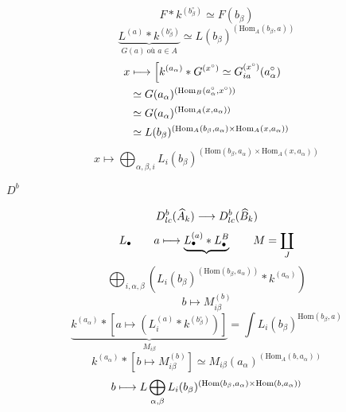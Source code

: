 \[
F*k^{(b_\beta^\circ)}\simeq F(b_\beta)
\]
\[
\underbrace{L^{(a)}*k^{(b_\beta^\circ)}}_{G(a)\ \text{où }a\in A}
\simeq L(b_\beta)^{(\mathrm{Hom}_A(b_\beta,a))}
\]
\[
\begin{aligned}
x&\longmapsto\left[k^{(a_\alpha)}*G^{(x^\circ)}
 \simeq G_{{i}{{a}}}^{(x^\circ)}(a_\alpha^\circ)\right.\\
&\simeq G(a_\alpha)^{(\mathrm{Hom}_{{B}}(a_\alpha^\circ,x^\circ))}\\
&\simeq G(a_\alpha)^{(\mathrm{Hom}_A(x,a_\alpha))}\\
&\simeq L(b_\beta)^{(\mathrm{Hom}_A(b_\beta,a_\alpha)\times\mathrm{Hom}_A(x,a_\alpha))}
\end{aligned}
\]
\[
x\longmapsto\bigoplus_{\alpha,\beta,i}L_i(b_\beta)^{(\mathrm{Hom}(b_\beta,a_\alpha)\times\mathrm{Hom}_A(x,a_\alpha))}
\]

$D^b$


\[
D_{lc}^b(\widehat A_k)\longrightarrow D_{lc}^b(\widehat{{B}}_k)
\]
\[
L_\bullet\qquad a\longmapsto\underbrace{L_\bullet^{(a)}*L_\bullet^B}
\qquad M=\coprod_{{J}}
\]
\[
\bigoplus_{i,\alpha,\beta}
\left(L_i(b_\beta)^{(\mathrm{Hom}(b_\beta,a_\alpha))}*k^{(a_\alpha)}\right)
\]
\[
b\longmapsto M_{i\beta}^{(b)}
\]
\[
\underbrace{k^{(a_\alpha)}*\left[a\longmapsto
\left(L_i^{(a)}*k^{(b_\beta^\circ)}\right)\right]}_{M_{i\beta}}
=\int L_i(b_\beta)^{\mathrm{Hom}(b_\beta,a)}
\]
\[
k^{(a_\alpha)}*\left[b\longmapsto M_{i\beta}^{(b)}\right]
\simeq M_{i\beta}(a_\alpha)^{(\mathrm{Hom}_A(b,a_\alpha))}
\]
\[
b\longmapsto {{L}}\bigoplus_{\alpha,\beta}
L_i(b_\beta)^{(\mathrm{Hom}(b_\beta,a_\alpha)\times\mathrm{Hom}(b,a_\alpha))}
\]
